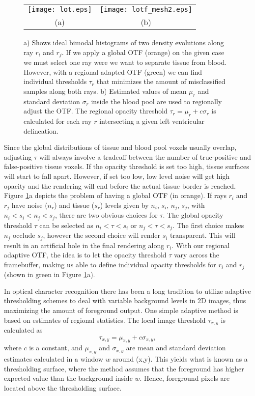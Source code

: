 \begin{figure}  
\begin{center}
\begin{tabular}{cc}
\texttt{[image: lot.eps]} & 
\texttt{[image: lotf\_mesh2.eps]}\\ %
(a) & (b)
\end{tabular}
\end{center}
\caption[example] { \label{fig:lotf}  a) Shows ideal bimodal histograms of two density evolutions along ray $r_i$ and $r_j$. If we apply a global OTF (orange) on the given case we must select one ray were we want to separate tissue from blood. However, with a regional adapted OTF (green) we can find individual thresholds $\tau_r$ that minimizes the amount of misclassified samples along both rays. b) Estimated values of mean $\mu_r$ and standard deviation $\sigma_r$ inside the blood pool are used to regionally adjust the OTF. The regional opacity threshold $\tau_r = \mu_r + c\sigma_r$ is calculated for each ray $r$ intersecting a given left ventricular delineation.}
\end{figure} 
Since the global distributions of tissue and blood pool voxels usually overlap, adjusting $\tau$ will always involve a tradeoff between 
the number of true-positive and false-positive tissue voxels. If the opacity threshold is set too high, tissue surfaces will start to fall apart. However, if set too low, low level noise will get high opacity and the rendering will end before the actual tissue border is reached. Figure \ref{fig:lotf}a depicts the problem of having a global OTF (in orange). If rays $r_i$ and $r_j$ have noise ($n_r$) and tissue ($s_r$) levels given by $n_i$, $s_i$, $n_j$, $s_j$, with $n_i < s_i < n_j < s_j$, there are two obvious choices for $\tau$. The global opacity threshold $\tau$ can be selected as $n_i < \tau < s_i$ or $n_j < \tau < s_j$. The first choice makes $n_j$ occlude $s_j$, however the second choice will render $s_i$ transparent. This will result in an artificial hole in the final rendering along $r_i$. With our regional adaptive OTF, the idea is to let the opacity threshold $\tau$ vary across the framebuffer, making us able to define individual opacity thresholds for $r_i$ and $r_j$ (shown in green in Figure \ref{fig:lotf}a). 

In optical character recognition there has been a long tradition to utilize adaptive thresholding schemes to deal with variable background levels in 2D images\cite{Niblack1985}, thus maximizing the amount of foreground output. One simple adaptive method is based on estimates of regional statistics. The local image threshold $\tau_{x,y}$ is calculated as
\begin{equation}
\tau_{x,y} = \mu_{x,y} + c\sigma_{x,y},
\label{eq:niblack}
\end{equation}
where $c$ is a constant, and $\mu_{x,y}$ and $\sigma_{x,y}$ are mean and standard deviation estimates calculated in a window $w$ around (x,y). This yields what is known as a thresholding surface, where the method assumes that the foreground has higher expected value than the background inside $w$. Hence, foreground pixels are located above the thresholding surface.
	
